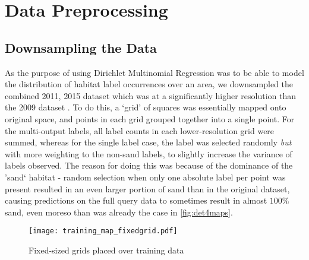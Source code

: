 \section{Data Preprocessing}

\subsection{Downsampling the Data}
As the purpose of using Dirichlet Multinomial Regression was to be able to model the distribution of habitat label occurrences over an area, we downsampled the combined 2011, 2015 dataset which was at a significantly higher resolution than the 2009 dataset . To do this, a `grid' of squares was essentially mapped onto original space, and points in each grid grouped together into a single point. For the multi-output labels, all label counts in each lower-resolution grid were summed, whereas for the single label case, the label was selected randomly \textit{but} with more weighting to the non-sand labels, to slightly increase the variance of labels observed. The reason for doing this was because of the dominance of the 'sand` habitat - random selection when only one absolute label per point was present resulted in an even larger portion of sand than in the original dataset, causing predictions on the full query data to sometimes result in almost $100\%$ sand, even moreso than was already the case in \autoref{fig:det4maps}.

% 
% 
% 
\begin{figure}[H]
    \texttt{[image: training\_map\_fixedgrid.pdf]}
    \caption{Fixed-sized grids placed over training data }
    \label{fig:gridsplit}
\end{figure} 

